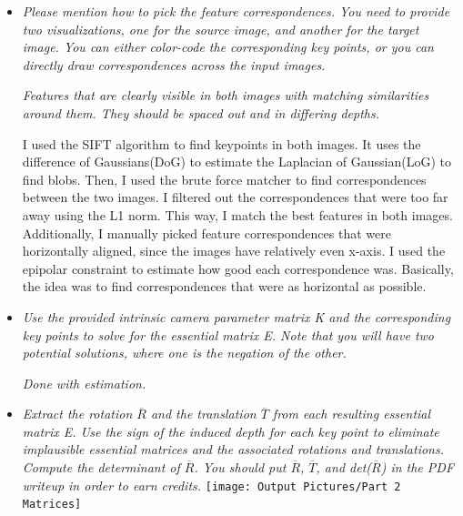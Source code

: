 \documentclass[11pt]{article}
\begin{document}
    \begin{itemize}
        \item \textit{Please mention how to pick the feature correspondences. You need to provide two visualizations,
            one for the source image, and another for the target image. You can either color-code the corresponding
            key points, or you can directly draw correspondences across the input images.}
        \par
        \textit{\textemdash Features that are clearly visible in both images with matching similarities around them.
        They should be spaced out and in differing depths.}
        \par
        I used the SIFT algorithm to find keypoints in both images. It uses the difference of Gaussians(DoG) to estimate
        the Laplacian of Gaussian(LoG) to find blobs. Then, I used the brute force matcher to find
        correspondences between the two images. I filtered out the correspondences that were too far away using
        the L1 norm. This way, I match the best features in both images.\newline
        Additionally, I manually picked feature correspondences that were horizontally aligned, since the images have
        relatively even x-axis. I used the epipolar constraint to estimate how good each correspondence was.
        Basically, the idea was to find correspondences that were as horizontal as possible.\newline

        \item \textit{Use the provided intrinsic camera parameter matrix K and the corresponding key points to solve
        for the essential matrix E. Note that you will have two potential solutions, where one is the negation of the
        other.}
        \par
        \textit{\textemdash Done with estimation.}
        \par

        \item \textit{Extract the rotation $\overline{R}$ and the translation $\overline{T}$ from each resulting
        essential matrix E. Use the sign of the induced depth for each key point to eliminate implausible essential
        matrices and the associated rotations and translations. Compute the determinant of $\overline{R}$. You should
        put $\overline{R}$, $\overline{T}$, and det($\overline{R}$) in
        the PDF writeup in order to earn credits.}\newline
        \texttt{[image: Output Pictures/Part 2 Matrices]}\newline


\end{itemize}
\end{document}
